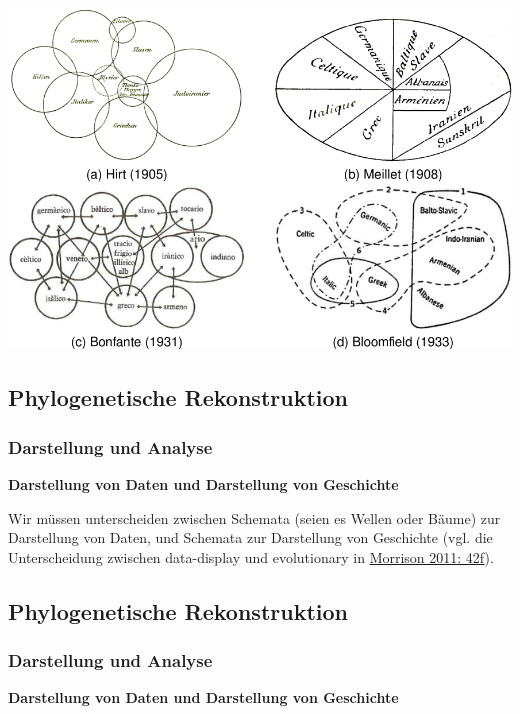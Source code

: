 \href{img/netze.png}{\includegraphics{img/netze.png}}

\subsection{\texorpdfstring{{Phylogenetische
Rekonstruktion}}{Phylogenetische Rekonstruktion}}

\subsubsection{\texorpdfstring{{Darstellung und
Analyse}}{Darstellung und Analyse}}

\textbf{Darstellung von Daten und Darstellung von Geschichte}

Wir müssen unterscheiden zwischen Schemata (seien es Wellen oder Bäume)
zur Darstellung von Daten, und Schemata zur Darstellung von Geschichte
(vgl. die Unterscheidung zwischen data-display und evolutionary in
\href{http://bibliography.lingpy.org?key=Morrison2011}{Morrison 2011:
42f}).

\subsection{\texorpdfstring{{Phylogenetische
Rekonstruktion}}{Phylogenetische Rekonstruktion}}

\subsubsection{\texorpdfstring{{Darstellung und
Analyse}}{Darstellung und Analyse}}

\textbf{Darstellung von Daten und Darstellung von Geschichte}

